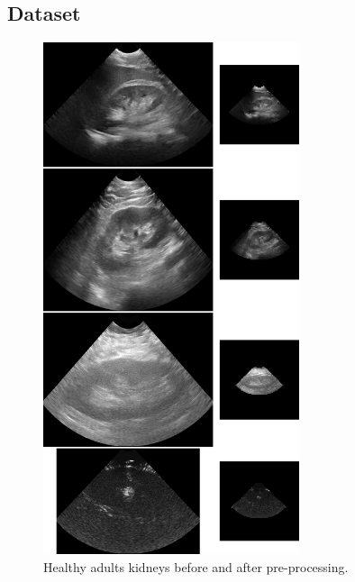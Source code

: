 \subsection{Dataset}
\label{ssec:data}

\begin{figure}[htbp]
    \centering
	\includegraphics[width=0.67\textwidth]{img_transfer/adults_prep}
    \caption{Healthy adults kidneys before and after pre-processing.}
    \label{fig:adults_prep}
\end{figure}

